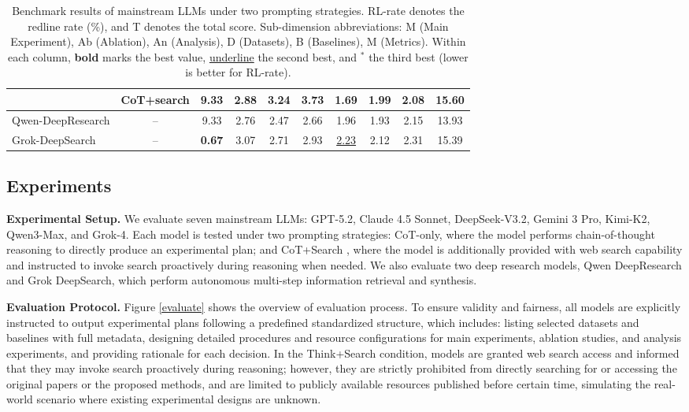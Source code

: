\documentclass[letterpaper]{article} %
\begin{document}
\begin{table}[tb]
\begin{tabular}{lccccccccc}
\cline{2-10}
& CoT+search & 9.33 & 2.88 & 3.24 & 3.73 & 1.69 & 1.99 & 2.08 & 15.60 \\
\midrule
Qwen-DeepResearch & -- & 9.33 & 2.76 & 2.47 & 2.66 & 1.96 & 1.93 & 2.15 & 13.93 \\
\midrule
Grok-DeepSearch & -- & \textbf{0.67} & 3.07 & 2.71 & 2.93 & \underline{2.23} & 2.12 & 2.31 & 15.39 \\
\bottomrule
\end{tabular}
\caption{Benchmark results of mainstream LLMs under two prompting strategies. RL-rate denotes the redline rate (\%), and T denotes the total score. Sub-dimension abbreviations: M (Main Experiment), Ab (Ablation), An (Analysis), D (Datasets), B (Baselines), M (Metrics). Within each column, \textbf{bold} marks the best value, \underline{underline} the second best, and $^*$ the third best (lower is better for RL-rate).}
\label{benchmark result}
\end{table}

\subsection{Experiments}
\textbf{Experimental Setup.} We evaluate seven mainstream LLMs: GPT-5.2, Claude 4.5 Sonnet, DeepSeek-V3.2, Gemini 3 Pro, Kimi-K2, Qwen3-Max, and Grok-4. 
Each model is tested under two prompting strategies: CoT-only, where the model performs chain-of-thought reasoning to directly produce 
an experimental plan; and CoT+Search , where the model is additionally provided with web search capability and instructed to invoke 
search proactively during reasoning when needed. We also evaluate two deep research models, Qwen DeepResearch and Grok DeepSearch, which perform 
autonomous multi-step information retrieval and synthesis.

\textbf{Evaluation Protocol.} Figure \ref{evaluate} shows the overview of evaluation process. To ensure validity and fairness, all models are explicitly instructed to output experimental plans following a predefined standardized structure,
which includes: listing selected datasets and baselines with full metadata, designing detailed procedures and resource configurations for main
experiments, ablation studies, and analysis experiments, and providing rationale for each decision. In the Think+Search condition, models are
granted web search access and informed that they may invoke search proactively during reasoning; however, they are strictly prohibited from
directly searching for or accessing the original papers or the proposed methods, and are limited to publicly available resources published before
certain time, simulating the real-world scenario where existing experimental designs are unknown. 
\end{document}
